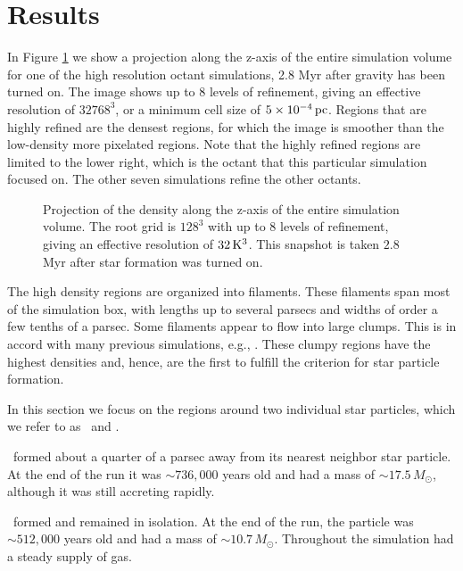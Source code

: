 \documentclass[../dissertation.tex]{subfiles}
\begin{document}
\section{Results}\label{sec:hydro_results}
In Figure \ref{fig:hydro_entire projection} we show a projection along the z-axis 
 of the entire simulation volume 
for one of the high resolution octant simulations, 2.8 Myr after gravity has been turned on. 
The image shows up to 8 levels of refinement, giving an effective resolution 
of $32768^3$, or a minimum cell size of $5\times 10^{-4} \,\rm pc$.
Regions that are highly refined are the densest regions, for which the image 
is smoother than the low-density more pixelated regions.  Note that the highly 
refined regions are limited to the lower right, which is the octant that
this particular simulation focused on. The other seven simulations refine the other octants.
%
\begin{figure}[htb] %
\caption[Hydro Simulation Box]{\label{fig:hydro_entire projection}Projection of the density along the z-axis of the entire simulation volume. 
The root grid is $128^3$ with up to 8 levels of refinement, giving an effective resolution of $32\,{\rm K}^3$. 
This snapshot is taken $2.8$ Myr after star formation was turned on.}
\end{figure}
%

The high density regions are organized into filaments.
These filaments span most of the simulation box, with lengths up to 
several parsecs and widths of order a few tenths of a parsec. Some filaments appear 
to flow into large clumps. This is in accord with many previous simulations, e.g., 
\citep{1998ApJ...504..300P, 2015ApJ...800...49L}. These clumpy regions 
have the highest densities and, hence, are the first to fulfill 
the criterion for star particle formation.

In this section we focus on the regions around  two individual star 
particles, which we refer to as \partA\ and \partB.

\PartA\ formed about a quarter of a parsec away from its nearest neighbor star particle.
At the end of the run it was $\sim 736,000$ years old and had 
a mass of $\sim 17.5 \, M_\odot$, although it was still accreting rapidly.

\PartB\ formed and remained in isolation.
At the end of the run, the particle was $\sim 512,000$ years 
old and had a mass of $\sim 10.7 \, M_\odot$.
Throughout the simulation \partB had a steady supply of gas.
\end{document}
